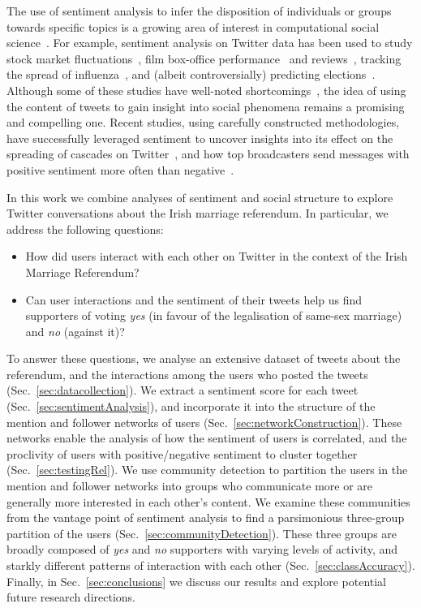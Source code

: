 \documentclass{article}
\begin{document}
The use of sentiment analysis to infer the disposition of individuals
or groups towards specific topics is a growing area of interest in
computational social science~\cite{Mislove2010, liu2012survey,
  PangSentimentOpinion2008,TahaBisedReview2016,Dodds2015,
  Bliss2012}. For example, sentiment analysis on Twitter data has been
used to study stock market
fluctuations~\cite{bollen2011twitter,zheludev2015can}, film box-office
performance~\cite{HubermanPredFutureSM2010} and
reviews~\cite{turney2002ThumbsUpOrThumbsDown}, tracking the spread of
influenza~\cite{CristianiniTrackFluSM2010}, and (albeit
controversially) predicting elections~\cite{tumasjan2010predicting,
  OConnor2010tweets, livne2011party, bermingham2011using,
  unankard2014predicting}. Although some of these studies have
well-noted shortcomings~\cite{gayo2012wanted, Gayo-Avello2012}, the
idea of using the content of tweets to gain insight into social
phenomena remains a promising and compelling one. Recent studies,
using carefully constructed methodologies, have successfully leveraged
sentiment to uncover insights into its effect on the spreading of
cascades on Twitter~\cite{alvarez2015sentiment}, and how top
broadcasters send messages with positive sentiment more often than
negative~\cite{Charlton2016InTheMood}.

In this work we combine analyses of sentiment and social structure to
explore Twitter conversations about the Irish marriage referendum. In
particular, we address the following questions:
\begin{itemize}
\item How did users interact with each other on Twitter in the context
  of the Irish Marriage Referendum?
  \item Can user interactions and the sentiment of their tweets help
    us find supporters of voting \textit{yes} (in favour of the
    legalisation of same-sex marriage) and \textit{no} (against it)?
\end{itemize}
To answer these questions, we analyse an extensive dataset of tweets
about the referendum, and the interactions among the users who posted
the tweets (Sec.~\ref{sec:datacollection}). We extract a sentiment
score for each tweet (Sec.~\ref{sec:sentimentAnalysis}), and
incorporate it into the structure of the mention and follower networks
of users (Sec.~\ref{sec:networkConstruction}). These networks enable
the analysis of how the sentiment of users is correlated, and the
proclivity of users with positive/negative sentiment to cluster
together (Sec.~\ref{sec:testingRel}). We use community detection to
partition the users in the mention and follower networks into groups
who communicate more or are generally more interested in each other's
content. We examine these communities from the vantage point of
sentiment analysis to find a parsimonious three-group partition of the
users (Sec.~\ref{sec:communityDetection}). These three groups are
broadly composed of {\it yes} and {\it no} supporters with varying
levels of activity, and starkly different patterns of interaction with
each other (Sec.~\ref{sec:classAccuracy}).  Finally, in
Sec.~\ref{sec:conclusions} we discuss our results and explore
potential future research directions.
\end{document}
